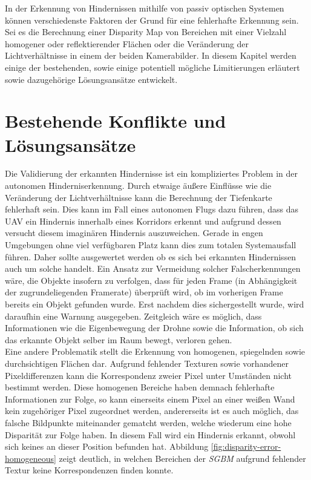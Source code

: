 In der Erkennung von Hindernissen mithilfe von passiv optischen Systemen können verschiedenste Faktoren der Grund für eine fehlerhafte Erkennung sein. Sei es die Berechnung einer Disparity Map von Bereichen mit einer Vielzahl homogener oder reflektierender Flächen oder die Veränderung der Lichtverhältnisse in einem der beiden Kamerabilder. In diesem Kapitel werden einige der bestehenden, sowie einige potentiell mögliche Limitierungen erläutert sowie dazugehörige Lösungsansätze entwickelt.\\


\section{Bestehende Konflikte und Lösungsansätze}
\label{sec:existing_conflicts}

Die Validierung der erkannten Hindernisse ist ein kompliziertes Problem in der autonomen Hinderniserkennung. Durch etwaige äußere Einflüsse wie die Veränderung der Lichtverhältnisse kann die Berechnung der Tiefenkarte fehlerhaft sein. Dies kann im Fall eines autonomen Flugs dazu führen, dass das UAV ein Hindernis innerhalb eines Korridors erkennt und aufgrund dessen versucht diesem imaginären Hindernis auszuweichen. Gerade in engen Umgebungen ohne viel verfügbaren Platz kann dies zum totalen Systemausfall führen. Daher sollte ausgewertet werden ob es sich bei erkannten Hindernissen auch um solche handelt. Ein Ansatz zur Vermeidung solcher Falscherkennungen wäre, die Objekte insofern zu verfolgen, dass für jeden Frame (in Abhängigkeit der zugrundeliegenden Framerate) überprüft wird, ob im vorherigen Frame bereits ein Objekt gefunden wurde. Erst nachdem dies sichergestellt wurde, wird daraufhin eine Warnung ausgegeben. Zeitgleich wäre es möglich, dass Informationen wie die Eigenbewegung der Drohne sowie die Information, ob sich das erkannte Objekt selber im Raum bewegt, verloren gehen.\\

\noindent
Eine andere Problematik stellt die Erkennung von homogenen, spiegelnden sowie durchsichtigen Flächen dar. Aufgrund fehlender Texturen sowie vorhandener Pixeldifferenzen kann die Korrespondenz zweier Pixel unter Umständen nicht bestimmt werden. Diese homogenen Bereiche haben demnach fehlerhafte Informationen zur Folge, so kann  einerseits einem Pixel an einer weißen Wand kein zugehöriger Pixel zugeordnet werden, andererseits ist es auch möglich, das falsche Bildpunkte miteinander gematcht werden, welche wiederum eine hohe Disparität zur Folge haben. In diesem Fall wird ein Hindernis erkannt, obwohl sich keines an dieser Position befunden hat. Abbildung \ref{fig:disparity-error-homogeneous} zeigt deutlich, in welchen Bereichen der \emph{SGBM} aufgrund fehlender Textur keine Korrespondenzen finden konnte.\\

